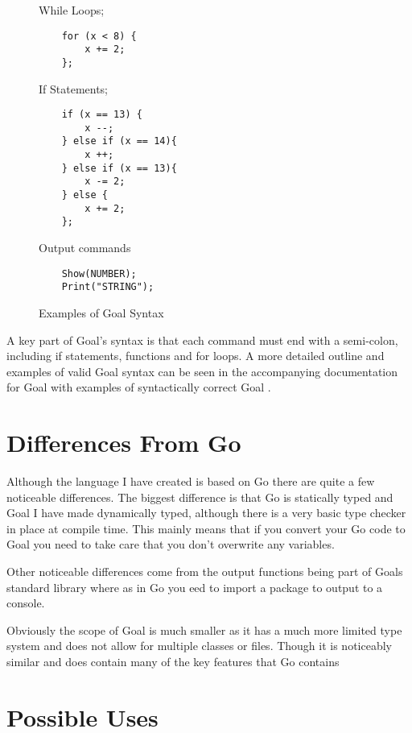 \begin{figure}[h]
\centering
While Loops;
\begin{lstlisting}
	for (x < 8) {
		x += 2;
	};
\end{lstlisting}

If Statements;
\begin{lstlisting}
	if (x == 13) {
		x --;
	} else if (x == 14){
		x ++;
	} else if (x == 13){
		x -= 2;
	} else {
		x += 2;
	};
\end{lstlisting}

Output commands
\begin{lstlisting}
	Show(NUMBER);
	Print("STRING");
\end{lstlisting}

\caption{Examples of Goal Syntax}
\label{fig:egGoalSyntax} 
\end{figure}
 
A key part of Goal's syntax is that each command must end with a semi-colon, including if statements, functions and for loops. A more detailed outline and examples of valid Goal syntax can be seen in the accompanying documentation for Goal with examples of syntactically correct Goal \cite{GoalDoc}. 


\section{Differences From Go}

Although the language I have created is based on Go there are quite a few noticeable differences. The biggest difference is that Go is statically typed and Goal I have made dynamically typed, although there is a very basic type checker in place at compile time. This mainly means that if you convert your Go code to Goal you need to take care that you don't overwrite any variables.

Other noticeable differences come from the output functions being part of Goals standard library where as in Go you eed to import a package to output to a console.

Obviously the scope of Goal is much smaller as it has a much more limited type system and does not allow for multiple classes or files. Though it is noticeably similar and does contain many of the key features that Go contains 

\section{Possible Uses}

